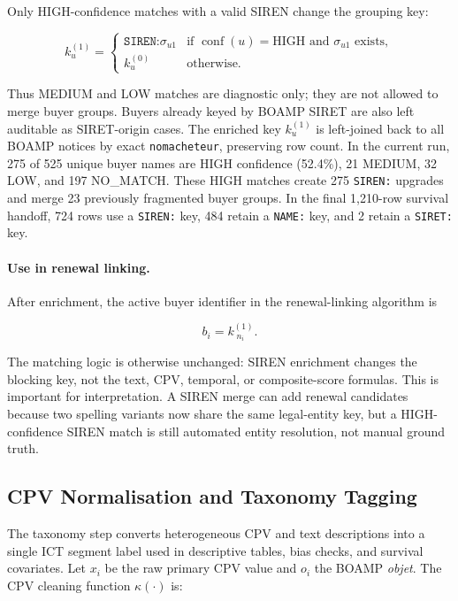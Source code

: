 \documentclass[12pt, a4paper]{article}
\begin{document}
Only HIGH-confidence matches with a valid SIREN change the grouping key:

\begin{equation}
  k_u^{(1)} =
  \begin{cases}
    \texttt{SIREN:}\sigma_{u1}
      & \text{if } \operatorname{conf}(u)=\text{HIGH}
        \text{ and } \sigma_{u1} \text{ exists},\\
    k_u^{(0)} & \text{otherwise.}
  \end{cases}
\end{equation}

\noindent Thus MEDIUM and LOW matches are diagnostic only; they are not allowed
to merge buyer groups. Buyers already keyed by BOAMP SIRET are also left
auditable as SIRET-origin cases. The enriched key $k_u^{(1)}$ is left-joined
back to all BOAMP notices by exact \texttt{nomacheteur}, preserving row count.
In the current run, 275 of 525 unique buyer names are HIGH confidence
(52.4\%), 21 MEDIUM, 32 LOW, and 197 NO\_MATCH. These HIGH matches create 275
\texttt{SIREN:} upgrades and merge 23 previously fragmented buyer groups. In
the final 1{,}210-row survival handoff, 724 rows use a \texttt{SIREN:} key,
484 retain a \texttt{NAME:} key, and 2 retain a \texttt{SIRET:} key.

\paragraph{Use in renewal linking.}
After enrichment, the active buyer identifier in the renewal-linking algorithm
is

\begin{equation}
  b_i = k_{\;n_i}^{(1)}.
\end{equation}

\noindent The matching logic is otherwise unchanged: SIREN enrichment changes
the blocking key, not the text, CPV, temporal, or composite-score formulas.
This is important for interpretation. A SIREN merge can add renewal candidates
because two spelling variants now share the same legal-entity key, but a
HIGH-confidence SIREN match is still automated entity resolution, not manual
ground truth.

\subsection{CPV Normalisation and Taxonomy Tagging}
\label{sec:taxonomy_method}

The taxonomy step converts heterogeneous CPV and text descriptions into a
single ICT segment label used in descriptive tables, bias checks, and survival
covariates. Let $x_i$ be the raw primary CPV value and $o_i$ the BOAMP
\textit{objet}. The CPV cleaning function $\kappa(\cdot)$ is:
\end{document}
